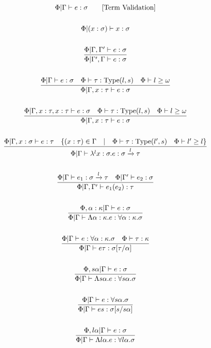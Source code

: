 \documentclass {article}
\begin{document}
\begin{gather*}
\Phi | \Gamma \vdash e : \sigma \tag* {[\text{Term Validation}]}  \\
\\
\Phi | (x : \sigma) \vdash x : \sigma \\
\\
\frac
{\Phi | \Gamma, \Gamma' \vdash e : \sigma}
{\Phi | \Gamma', \Gamma \vdash e : \sigma} \\
\\
\frac
{\Phi | \Gamma \vdash e : \sigma \quad \Phi \vdash \tau : \text{Type}(l,s) \quad \Phi \vdash l \geq \omega }
{\Phi | \Gamma, x : \tau \vdash e : \sigma } \\
\\
\frac
{\Phi | \Gamma, x : \tau, x : \tau \vdash e : \sigma \quad \Phi \vdash \tau : \text{Type}(l,s) \quad \Phi \vdash l \geq \omega }
{\Phi | \Gamma, x : \tau \vdash e : \sigma } \\
\\
\frac
{\Phi | \Gamma, x : \sigma \vdash e : \tau \quad \{ (x : \tau) \in \Gamma \quad | \quad \Phi \vdash \tau : \text{Type} (l', s) \quad \Phi \vdash l' \geq l \} }
{\Phi | \Gamma \vdash \lambda^l x:\sigma. e : \sigma \xrightarrow l \tau } \\
\\
\frac
{\Phi | \Gamma \vdash e_1 : \sigma \xrightarrow l \tau \quad \Phi | \Gamma' \vdash e_2 : \sigma}
{\Phi | \Gamma, \Gamma' \vdash e_1(e_2) : \tau} \\
\\
\frac
{\Phi, \alpha : \kappa | \Gamma \vdash e : \sigma}
{\Phi | \Gamma \vdash \Lambda \alpha : \kappa. e : \forall \alpha : \kappa. \sigma } \\
\\
\frac
{\Phi | \Gamma \vdash e : \forall \alpha : \kappa. \sigma \quad \Phi \vdash \tau : \kappa }
{\Phi | \Gamma \vdash e \tau : \sigma [\tau/\alpha] } \\
\\
\frac
{\Phi, s \alpha | \Gamma \vdash e : \sigma}
{\Phi | \Gamma \vdash \Lambda s \alpha. e : \forall s \alpha. \sigma} \\
\\
\frac
{\Phi | \Gamma \vdash e : \forall s \alpha. \sigma}
{\Phi | \Gamma \vdash e s : \sigma [s/s \alpha]} \\
\\
\frac
{\Phi, l \alpha | \Gamma \vdash e : \sigma }
{\Phi | \Gamma \vdash \Lambda l \alpha. e : \forall l \alpha. \sigma} \\

\end{gather*}
\end{document}
